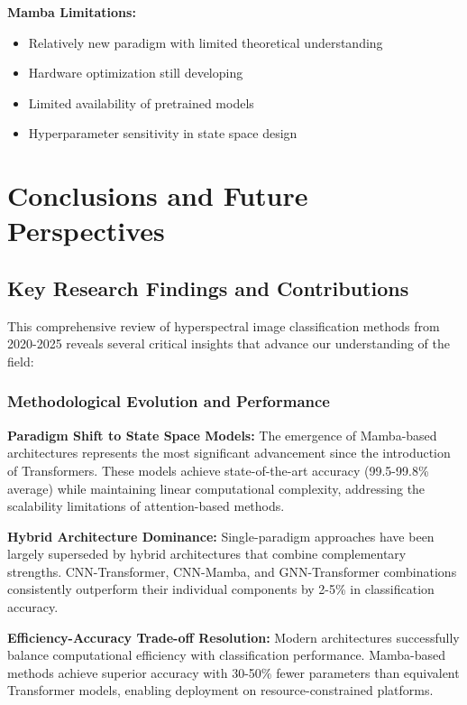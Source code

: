 \documentclass[journal]{IEEEtran}
\begin{document}
\textbf{Mamba Limitations:}
\begin{itemize}
\item Relatively new paradigm with limited theoretical understanding
\item Hardware optimization still developing
\item Limited availability of pretrained models
\item Hyperparameter sensitivity in state space design
\end{itemize}


\section{Conclusions and Future Perspectives}

\subsection{Key Research Findings and Contributions}

This comprehensive review of hyperspectral image classification methods from 2020-2025 reveals several critical insights that advance our understanding of the field:

\subsubsection{Methodological Evolution and Performance}

\textbf{Paradigm Shift to State Space Models:} The emergence of Mamba-based architectures represents the most significant advancement since the introduction of Transformers. These models achieve state-of-the-art accuracy (99.5-99.8\% average) while maintaining linear computational complexity, addressing the scalability limitations of attention-based methods.

\textbf{Hybrid Architecture Dominance:} Single-paradigm approaches have been largely superseded by hybrid architectures that combine complementary strengths. CNN-Transformer, CNN-Mamba, and GNN-Transformer combinations consistently outperform their individual components by 2-5\% in classification accuracy.

\textbf{Efficiency-Accuracy Trade-off Resolution:} Modern architectures successfully balance computational efficiency with classification performance. Mamba-based methods achieve superior accuracy with 30-50\% fewer parameters than equivalent Transformer models, enabling deployment on resource-constrained platforms.
\end{document}
